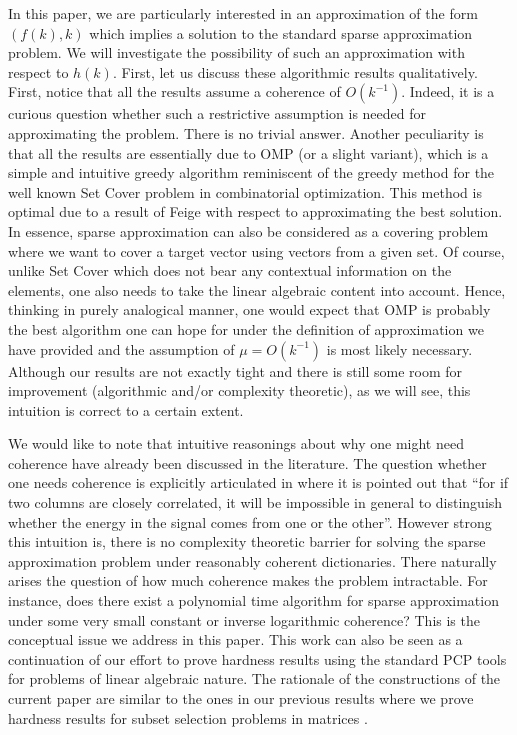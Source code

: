 \documentclass[11pt]{article}
\begin{document}
In this paper, we are particularly interested in an approximation
of the form $(f(k),k)$ which implies a solution to the standard
sparse approximation problem. We will investigate the possibility of
such an approximation with respect to $h(k)$. First, let us
discuss these algorithmic results qualitatively.
First, notice that all the results assume a coherence of
$O(k^{-1})$. Indeed, it is a curious question whether such a
restrictive assumption is needed for approximating the problem.
There is no trivial answer. Another peculiarity is that all the
results are essentially due to OMP (or a slight variant), which is
a simple and intuitive greedy algorithm reminiscent of the greedy
method for the well known Set Cover problem in combinatorial
optimization. This method is optimal due to a result of Feige
\cite{Feige} with respect to approximating the best solution.
In essence, sparse approximation can also be considered as
a covering problem where we want to cover a target vector using
vectors from a given set. Of course, unlike Set Cover which does
not bear any contextual information on the elements, one also needs
to take the linear algebraic content into account. Hence, thinking
in purely analogical manner, one would expect that OMP is
probably the best algorithm one can hope for under the definition
of approximation we have provided and the assumption of $\mu =
O(k^{-1})$ is most likely necessary. Although our results are
not exactly tight and there is still some room for improvement
(algorithmic and/or complexity theoretic), as we will see, this
intuition is correct to a certain extent.

We would like to note that intuitive reasonings about why one
might need coherence have
already been discussed in the literature. The question whether
one needs coherence is explicitly articulated in \cite{Candes}
where it is pointed out that ``for if two columns are
closely correlated, it will be impossible in general to distinguish
whether the energy in the signal comes from one or the other''.
However strong this intuition is, there is no complexity theoretic
barrier for solving the sparse approximation problem under
reasonably coherent dictionaries. There naturally arises the
question of how much coherence makes the problem intractable.
For instance, does there exist a polynomial time algorithm
for sparse approximation under some very small constant or
inverse logarithmic coherence? This is the conceptual issue
we address in this paper. This work can also be seen as a continuation
of our effort to prove hardness results using the standard
PCP tools for problems of linear algebraic nature. The rationale of
the constructions of the current paper are similar to the ones
in our previous results where we prove hardness results for
subset selection problems in matrices \cite{CSSP-UG,Volume}.
\end{document}
